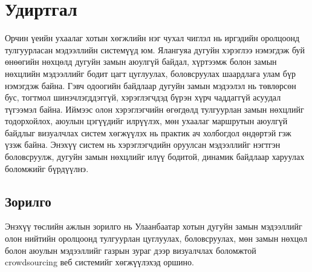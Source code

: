 {}
\label{Introduction} %
    \section*{Удиртгал}
    Орчин үеийн ухаалаг хотын хөгжлийн нэг чухал чиглэл нь иргэдийн оролцоонд тулгуурласан мэдээллийн системүүд юм. Ялангуяа дугуйн хэрэглээ нэмэгдэж буй өнөөгийн нөхцөлд дугуйн замын аюулгүй байдал, хүртээмж болон замын нөхцлийн мэдээллийг бодит цагт цуглуулах, боловсруулах шаардлага улам бүр нэмэгдэж байна. Гэвч одоогийн байдлаар дугуйн замын мэдээлэл нь төвлөрсөн бус, тогтмол шинэчлэгддэггүй, хэрэглэгчдэд бүрэн хүрч чаддаггүй асуудал түгээмэл байна.
    Иймээс олон хэрэглэгчийн өгөгдөлд тулгуурлан замын нөхцлийг тодорхойлох, аюулын цэгүүдийг илрүүлэх, мөн ухаалаг маршрутын аюулгүй байдлыг визуалчлах систем хөгжүүлэх нь практик ач холбогдол өндөртэй гэж үзэж байна. Энэхүү систем нь хэрэглэгчдийн оруулсан мэдээллийг нэгтгэн боловсруулж, дугуйн замын нөхцлийг илүү бодитой, динамик байдлаар харуулах боломжийг бүрдүүлнэ.

    \subsection*{Зорилго}
    Энэхүү төслийн ажлын зорилго нь Улаанбаатар хотын дугуйн замын мэдээллийг олон нийтийн оролцоонд тулгуурлан цуглуулах, боловсруулах, мөн замын нөхцөл болон аюулын мэдээллийг газрын зураг дээр визуалчлах боломжтой crowdsourcing веб системийг хөгжүүлэхэд оршино.

